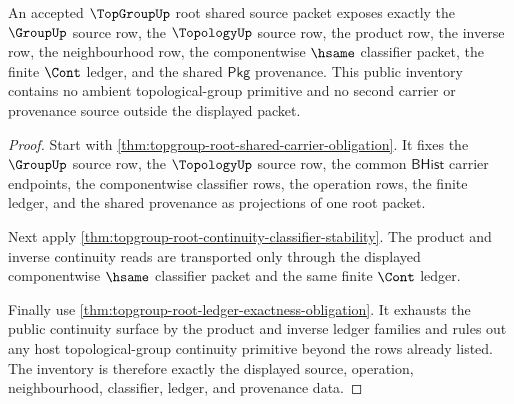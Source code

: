 \begin{theorem}
\label{thm:topgroup-root-public-obligation-inventory}
An accepted $\TopGroupUp$ root shared source packet exposes exactly the
$\GroupUp$ source row, the $\TopologyUp$ source row, the product row, the
inverse row, the neighbourhood row, the componentwise $\hsame$ classifier
packet, the finite $\Cont$ ledger, and the shared $\mathsf{Pkg}$ provenance.
This public inventory contains no ambient topological-group primitive and no
second carrier or provenance source outside the displayed packet.
\end{theorem}
\begin{proof}
Start with \autoref{thm:topgroup-root-shared-carrier-obligation}. It fixes
the $\GroupUp$ source row, the $\TopologyUp$ source row, the common
$\mathsf{BHist}$ carrier endpoints, the componentwise classifier rows, the
operation rows, the finite ledger, and the shared provenance as projections
of one root packet.

Next apply
\autoref{thm:topgroup-root-continuity-classifier-stability}. The product and
inverse continuity reads are transported only through the displayed
componentwise $\hsame$ classifier packet and the same finite $\Cont$ ledger.

Finally use \autoref{thm:topgroup-root-ledger-exactness-obligation}. It
exhausts the public continuity surface by the product and inverse ledger
families and rules out any host topological-group continuity primitive beyond
the rows already listed. The inventory is therefore exactly the displayed
source, operation, neighbourhood, classifier, ledger, and provenance data.
\end{proof}

